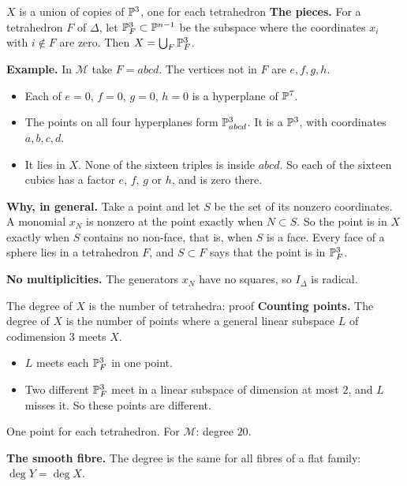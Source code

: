 \iffalse
\begin{frame}{\(X\) is a union of copies of \(\mathbb P^3\), one for each tetrahedron}
\textbf{The pieces.} For a tetrahedron \(F\) of \(\Delta\), let \(\mathbb P^3_F\subset\mathbb P^{n-1}\) be the subspace where the coordinates \(x_i\) with \(i\notin F\) are zero. Then \(X=\bigcup_F\mathbb P^3_F\).
\par\medskip
\textbf{Example.} In \(\mathcal M\) take \(F=abcd\). The vertices not in \(F\) are \(e,f,g,h\).
\begin{itemize}
\setlength{\itemsep}{2pt}
\item Each of \(e=0\), \(f=0\), \(g=0\), \(h=0\) is a hyperplane of \(\mathbb P^7\).
\item The points on all four hyperplanes form \(\mathbb P^3_{abcd}\). It is a \(\mathbb P^3\), with coordinates \(a,b,c,d\).
\item It lies in \(X\). None of the sixteen triples is inside \(abcd\). So each of the sixteen cubics has a factor \(e\), \(f\), \(g\) or \(h\), and is zero there.
\end{itemize}
\par\medskip
\textbf{Why, in general.} Take a point and let \(S\) be the set of its nonzero coordinates. A monomial \(x_N\) is nonzero at the point exactly when \(N\subset S\). So the point is in \(X\) exactly when \(S\) contains no non-face, that is, when \(S\) is a face. Every face of a sphere lies in a tetrahedron \(F\), and \(S\subset F\) says that the point is in \(\mathbb P^3_F\).
\par\medskip
\textbf{No multiplicities.} The generators \(x_N\) have no squares, so \(I_\Delta\) is radical.
\end{frame}

\begin{frame}{The degree of \(X\) is the number of tetrahedra: proof}
\textbf{Counting points.} The degree of \(X\) is the number of points where a general linear subspace \(L\) of codimension \(3\) meets \(X\).
\begin{itemize}
\setlength{\itemsep}{2pt}
\item \(L\) meets each \(\mathbb P^3_F\) in one point.
\item Two different \(\mathbb P^3_F\) meet in a linear subspace of dimension at most \(2\), and \(L\) misses it. So these points are different.
\end{itemize}
One point for each tetrahedron. For \(\mathcal M\): degree \(20\).
\par\medskip
\textbf{The smooth fibre.} The degree is the same for all fibres of a flat family: \(\deg Y=\deg X\).
\end{frame}

